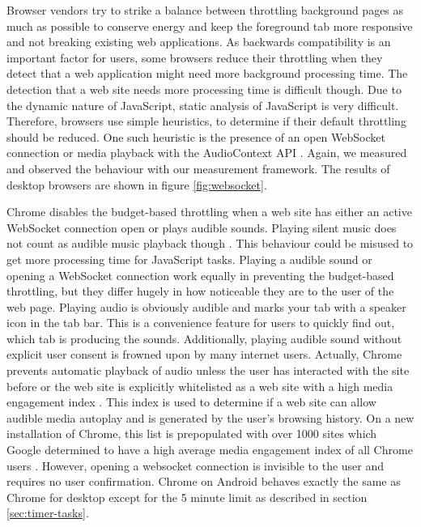 \documentclass[
	ruledheaders=section,%
	class=report,%
	thesis={type=bachelor},%
	accentcolor=9c,%
	custommargins=true,%
	marginpar=false,%
	parskip=half-,%
	fontsize=11pt,%
]{tudapub}
\begin{document}
  Browser vendors try to strike a balance between throttling background pages as much as possible to conserve energy and keep the foreground tab more responsive and not breaking existing web applications. As backwards compatibility is an important factor for users, some browsers reduce their throttling when they detect that a web application might need more background processing time. The detection that a web site needs more processing time is difficult though. Due to the dynamic nature of JavaScript, static analysis of JavaScript is very difficult. Therefore, browsers use simple heuristics, to determine if their default throttling should be reduced. One such heuristic is the presence of an open WebSocket connection \cite{mdn-websocket} or media playback with the AudioContext API \cite{mdn-audiocontext}. Again, we measured and observed the behaviour with our measurement framework. The results of desktop browsers are shown in figure \ref{fig:websocket}.

  Chrome disables the budget-based throttling when a web site has either an active WebSocket connection open or plays audible sounds. Playing silent music does not count as audible music playback though \cite{chrome-background-tabs}. This behaviour could be misused to get more processing time for JavaScript tasks. Playing a audible sound or opening a WebSocket connection work equally in preventing the budget-based throttling, but they differ hugely in how noticeable they are to the user of the web page. Playing audio is obviously audible and marks your tab with a speaker icon in the tab bar. This is a convenience feature for users to quickly find out, which tab is producing the sounds. Additionally, playing audible sound without explicit user consent is frowned upon by many internet users. Actually, Chrome prevents automatic playback of audio unless the user has interacted with the site before or the web site is explicitly whitelisted as a web site with a high media engagement index \cite{chrome-media-engagement-index}. This index is used to determine if a web site can allow audible media autoplay and is generated by the user's browsing history. On a new installation of Chrome, this list is prepopulated with over 1000 sites which Google determined to have a high average media engagement index of all Chrome users \cite{chrome-autoplay}. However, opening a websocket connection is invisible to the user and requires no user confirmation. Chrome on Android behaves exactly the same as Chrome for desktop except for the 5 minute limit as described in section \ref{sec:timer-tasks}.
\end{document}
